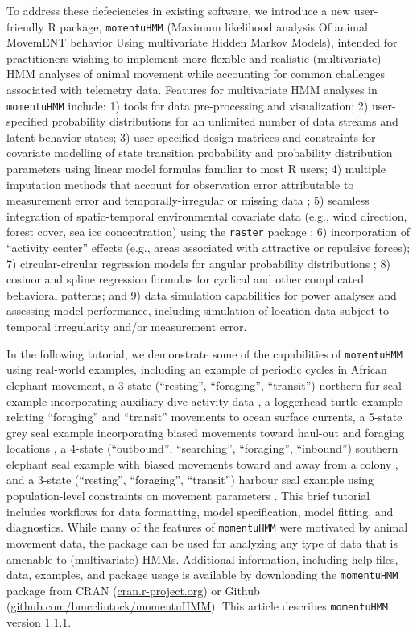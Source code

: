 \documentclass[12pt]{article}\usepackage[]{graphicx}\usepackage[]{color}
\begin{document}
To address these defeciencies in existing software, we introduce a new user-friendly R package, \verb|momentuHMM| (Maximum likelihood analysis Of animal MovemENT behavior Using multivariate Hidden Markov Models), intended for practitioners wishing to implement more flexible and realistic (multivariate) HMM analyses of animal movement while accounting for common challenges associated with telemetry data. Features for multivariate HMM analyses in \verb|momentuHMM| include: 1) tools for data pre-processing and visualization; 2) user-specified probability distributions for an unlimited number of data streams and latent behavior states; 3) user-specified design matrices and constraints for covariate modelling of state transition probability and probability distribution parameters using linear model formulas familiar to most R users; 4) multiple imputation methods that account for observation error attributable to measurement error and temporally-irregular or missing data \citep{HootenEtAl2017,McClintock2017}; 5) seamless integration of spatio-temporal environmental covariate data (e.g., wind direction, forest cover, sea ice concentration) using the \verb|raster| package \citep{Hijmans2016}; 6) incorporation of ``activity center'' effects (e.g., areas associated with attractive or repulsive forces); 7) circular-circular regression models for angular probability distributions \citep{DuchesneEtAl2015}; 8) cosinor \citep[e.g.][]{Cornelissen2014} and spline regression formulas for cyclical and other complicated behavioral patterns; and 9) data simulation capabilities for power analyses and assessing model performance, including simulation of location data subject to temporal irregularity and/or measurement error.  

In the following tutorial, we demonstrate some of the capabilities of \verb|momentuHMM| using real-world examples, including an example of periodic cycles in African elephant movement, a 3-state (``resting'', ``foraging'', ``transit'') northern fur seal example incorporating auxiliary dive activity data \citep{McClintockEtAl2014b}, a loggerhead turtle example relating ``foraging'' and ``transit'' movements to ocean surface currents, a 5-state grey seal example incorporating biased movements toward haul-out and foraging locations \citep{McClintockEtAl2012}, a 4-state (``outbound'', ``searching'', ``foraging'', ``inbound'') southern elephant seal example with biased movements toward and away from a colony \citep{MichelotEtAl2017}, and a 3-state (``resting'', ``foraging'', ``transit'') harbour seal example using population-level constraints on movement parameters \cite{McClintockEtAl2013c}. This brief tutorial includes workflows for data formatting, model specification, model fitting, and diagnostics. While many of the features of \verb|momentuHMM| were motivated by animal movement data, the package can be used for analyzing any type of data that is amenable to (multivariate) HMMs.  Additional information, including help files, data, examples, and package usage is available by downloading the \verb|momentuHMM| package from CRAN (\url{cran.r-project.org}) or Github (\url{github.com/bmcclintock/momentuHMM}). This article describes \verb|momentuHMM| version 1.1.1.
\end{document}
